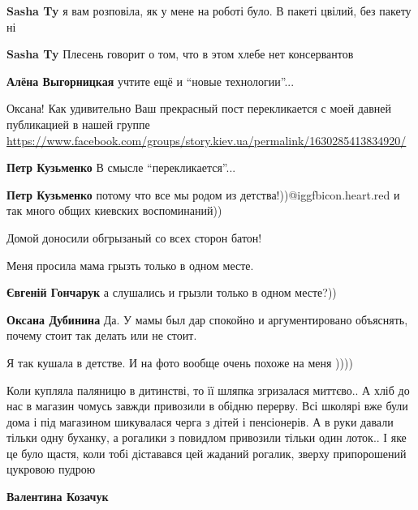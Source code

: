 \begin{itemize}
\begin{itemize}
\textbf{Sasha Ty} я вам розповіла, як у мене на роботі було.
В пакеті цвілий, без пакету ні

\textbf{Sasha Ty} Плесень говорит о том, что в этом хлебе нет консервантов

\textbf{Алёна Выгорницкая} учтите ещё и \enquote{новые технологии}...
\end{itemize} %


Оксана! Как удивительно Ваш прекрасный пост перекликается с моей давней
публикацией в нашей группе
\url{https://www.facebook.com/groups/story.kiev.ua/permalink/1630285413834920/}

\begin{itemize} %
\textbf{Петр Кузьменко}
В смысле \enquote{перекликается}...

\textbf{Петр Кузьменко} потому что все мы родом из детства!))@igg{fbicon.heart.red} и так много общих киевских воспоминаний))
\end{itemize} %

Домой доносили обгрызаный со всех сторон батон!

Меня просила мама грызть только в одном месте.

\begin{itemize} %
\textbf{Євгеній Гончарук} а слушались и грызли только в одном месте?))

\textbf{Оксана Дубинина} Да. У мамы был дар спокойно и аргументировано объяснять, почему стоит так делать или не стоит.
\end{itemize} %

Я так кушала в детстве. И на фото вообще очень похоже на меня ))))


Коли купляла паляницю в дитинстві, то її шляпка згризалася миттєво.. А хліб до
нас в магазин чомусь завжди привозили в обідню перерву. Всі школярі вже були
дома і під магазином шикувалася черга з дітей і пенсіонерів. А в руки давали
тільки одну буханку, а рогалики з повидлом привозили тільки один лоток.. І яке
це було щастя, коли тобі діставався цей жаданий рогалик, зверху припорошений
цукровою пудрою

\begin{itemize} %
\textbf{Валентина Козачук} 


\end{itemize}
\end{itemize}
